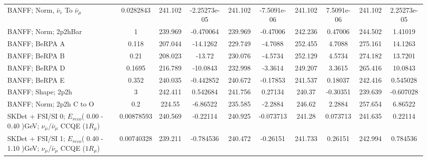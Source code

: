 \begin{tabular}{| l | S | S  S | S  S | S  S | S  S | }
                               BANFF; Norm, $\bar{\nu}_{e}$ To $\bar{\nu}_{\mu}$ &       0.0282843 &         241.102 &    -2.25273e-05 &         241.102 &     -7.5091e-06 &         241.102 &      7.5091e-06 &         241.102 &     2.25273e-05 \\ 
                                                            BANFF; Norm; 2p2hBar &               1 &         239.969 &       -0.470064 &         239.969 &        -0.47006 &         242.236 &         0.47006 &         244.502 &         1.41019 \\ 
                                                                  BANFF; BeRPA A &           0.118 &         207.044 &        -14.1262 &         229.749 &         -4.7088 &         252.455 &          4.7088 &         275.161 &         14.1263 \\ 
                                                                  BANFF; BeRPA B &            0.21 &         208.023 &          -13.72 &         230.076 &         -4.5734 &         252.129 &          4.5734 &         274.182 &         13.7201 \\ 
                                                                  BANFF; BeRPA D &          0.1695 &         216.789 &        -10.0843 &         232.998 &         -3.3614 &         249.207 &          3.3615 &         265.416 &         10.0843 \\ 
                                                                  BANFF; BeRPA E &           0.352 &         240.035 &       -0.442852 &         240.672 &        -0.17853 &         241.537 &         0.18037 &         242.416 &        0.545028 \\ 
                                                              BANFF; Shape; 2p2h &               3 &         242.411 &        0.542684 &         241.756 &         0.27134 &          240.37 &        -0.30351 &         239.639 &       -0.607028 \\ 
                                                        BANFF; Norm; 2p2h C to O &             0.2 &          224.55 &        -6.86522 &         235.585 &         -2.2884 &          246.62 &          2.2884 &         257.654 &         6.86522 \\ 
SKDet + FSI/SI  0; $E_{reco}$( 0.00 - 0.40 )GeV; $\nu_{\mu}$/$\bar{\nu}_{\mu}$ CCQE ($1R_{\mu}$) &      0.00878593 &         240.569 &        -0.22114 &         240.925 &       -0.073713 &          241.28 &        0.073713 &         241.635 &         0.22114 \\ 
SKDet + FSI/SI  1; $E_{reco}$( 0.40 - 1.10 )GeV; $\nu_{\mu}$/$\bar{\nu}_{\mu}$ CCQE ($1R_{\mu}$) &      0.00740328 &         239.211 &       -0.784536 &         240.472 &        -0.26151 &         241.733 &         0.26151 &         242.994 &        0.784536 \\ 

\end{tabular}
